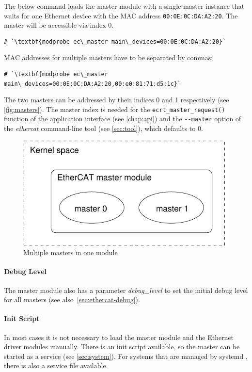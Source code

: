 \documentclass[a4paper,12pt,BCOR6mm,bibtotoc,idxtotoc]{scrbook}
\begin{document}
The below command loads the master module with a single master instance that
waits for one Ethernet device with the MAC address
\lstinline+00:0E:0C:DA:A2:20+. The master will be accessible via index $0$.

\begin{lstlisting}
# `\textbf{modprobe ec\_master main\_devices=00:0E:0C:DA:A2:20}`
\end{lstlisting}

MAC addresses for multiple masters have to be separated by commas:

\begin{lstlisting}
# `\textbf{modprobe ec\_master main\_devices=00:0E:0C:DA:A2:20,00:e0:81:71:d5:1c}`
\end{lstlisting}

The two masters can be addressed by their indices 0 and 1 respectively (see
\autoref{fig:masters}). The master index is needed for the
\lstinline+ecrt_master_request()+ function of the application interface (see
\autoref{chap:api}) and the \lstinline+--master+ option of the
\textit{ethercat} command-line tool (see \autoref{sec:tool}), which defaults
to $0$.

\begin{figure}[htbp]
  \centering
  \includegraphics[width=.5\textwidth]{images/masters}
  \caption{Multiple masters in one module}
  \label{fig:masters}
\end{figure}

\paragraph{Debug Level} The master module also has a parameter
\textit{debug\_level} to set the initial debug level for all masters (see
also~\autoref{sec:ethercat-debug}).

\paragraph{Init Script}

In most cases it is not necessary to load the master module and the Ethernet
driver modules manually. There is an init script available, so the master can
be started as a service (see \autoref{sec:system}). For systems that are
managed by systemd \cite{systemd}, there is also a service file available.
\end{document}
